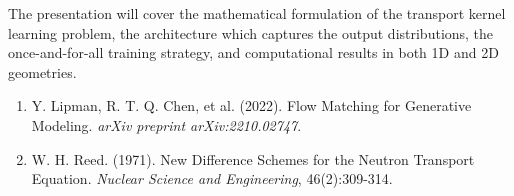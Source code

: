 \begin{talk}
The presentation will cover the mathematical formulation of the transport kernel learning problem, the architecture which captures the output distributions, the once-and-for-all training strategy, and computational  results in both 1D and 2D geometries.


\medskip
\begin{enumerate} 
\item[{[1]}] Y. Lipman, R. T. Q. Chen, et al. (2022). Flow Matching for Generative Modeling. {\it arXiv preprint arXiv:2210.02747}. 
\item[{[2]}] W. H. Reed. (1971). New Difference Schemes for the Neutron Transport Equation. {\it Nuclear Science and Engineering}, 46(2):309-314. 
\end{enumerate}

\end{talk}
